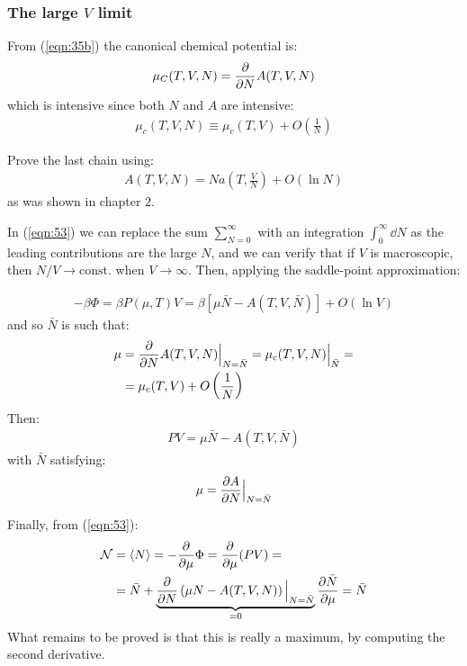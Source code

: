 \documentclass[../template.tex]{subfiles}
\begin{document}
\subsubsection{The large $V$ limit}
From (\ref{eqn:35b}) the canonical chemical potential is:
\begin{align*}
    \mu_C(T, V, N) = \pdv{N} A(T,V,N)
\end{align*}
which is intensive since both $N$ and $A$ are intensive:
\begin{align*}
    \mu_c(T,V,N) \equiv \mu_c (T, V) + O\left(\frac{1}{N} \right)
\end{align*}

\begin{exo}[2]
    Prove the last chain using:
    \begin{align*}
        A(T,V,N) = N a\left(T, \frac{V}{N} \right) + O(\ln N)
    \end{align*}
    as was shown in chapter $2$.
\end{exo}

In (\ref{eqn:53}) we can replace the sum $\sum_{N=0}^\infty$ with an integration $\int_0^\infty \dd{N}$ as the leading contributions are the large $N$, and we can verify  that if $V$ is macroscopic, then $N/V \to \text{const.}$ when $V \to \infty$. Then, applying the saddle-point approximation:

\begin{align*}
    -\beta \Phi = \beta P(\mu, T) V = \beta[\mu \bar{N} - A(T, V, \bar{N})] + O(\ln V)
\end{align*}
and so $\bar{N}$ is such that:
\begin{align*}
    \mu &= \pdv{N} A(T,V,N)\Big|_{N = \bar{N}} = \mu_c (T, V, N) \Big|_{\bar{N}} =\\
    &= \mu_c(T,V) + O\left(\frac{1}{N} \right)
\end{align*}
Then:
\begin{align*}
    PV = \mu \bar{N} - A(T, V, \bar{N})
\end{align*}
with $\bar{N}$ satisfying:
\begin{align*}
    \mu = \pdv{A}{N}(T,V,N)\Big|_{N = \bar{N}}
\end{align*}

Finally, from (\ref{eqn:53}):
\begin{align*}
    \mathcal{N} &= \langle N \rangle = -\pdv{\mu} \Phi = \pdv{\mu} (PV) =\\
    &= \bar{N} + \underbrace{\pdv{N} \left(\mu N - A(T, V, N)\right)\Big|_{N = \bar{N}}}_{=0}  \pdv{\bar{N}}{\mu} = \bar{N}
\end{align*}
What remains to be proved is that this is really a maximum, by computing the second derivative. 
\end{document}
